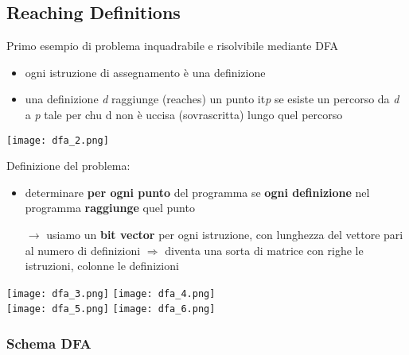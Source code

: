 \subsection{Reaching Definitions}

\noindent \begin{minipage}[c]{.6\textwidth}
Primo esempio di problema inquadrabile e risolvibile mediante DFA
\begin{itemize}
  \item ogni istruzione di assegnamento \`e una definizione
  \item una definizione \textit{d} raggiunge (reaches) un punto it\textit{p} se esiste un percorso da \textit{d} a \textit{p} tale per chu d non \`e uccisa (sovrascritta) lungo quel percorso
\end{itemize}
\end{minipage}
\hfill
\begin{minipage}[c]{.3\textwidth}
\texttt{[image: dfa\_2.png]}
\end{minipage}

Definizione del problema:
\begin{itemize}
  \item determinare \textbf{per ogni punto} del programma se \textbf{ogni definizione} nel programma \textbf{raggiunge} quel punto
  \item[$\rightarrow$] usiamo un \textbf{bit vector} per ogni istruzione, con lunghezza del vettore pari al numero di definizioni $\Rightarrow$ diventa una sorta di matrice con righe le istruzioni, colonne le definizioni
\end{itemize}

\begin{example}
      \centering
      \texttt{[image: dfa\_3.png]}\hfill
      \texttt{[image: dfa\_4.png]}\\
      \texttt{[image: dfa\_5.png]}\hfill
      \texttt{[image: dfa\_6.png]}
\end{example}


\subsubsection{Schema DFA}

